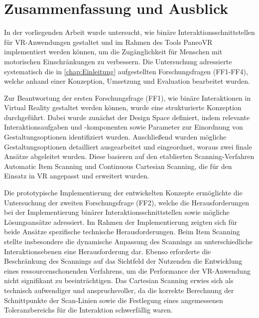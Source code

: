 \chapter{Zusammenfassung und Ausblick}
\label{chap:Fazit}

In der vorliegenden Arbeit wurde untersucht, wie binäre Interaktionsschnittstellen für VR-Anwendungen gestaltet und im Rahmen des Tools PaneoVR implementiert werden können, um die Zugänglichkeit für Menschen mit motorischen Einschränkungen zu verbessern. Die Untersuchung adressierte systematisch die in \autoref{chap:Einleitung} aufgestellten Forschungsfragen (FF1-FF4), welche anhand einer Konzeption, Umsetzung und Evaluation bearbeitet wurden.

Zur Beantwortung der ersten Forschungsfrage (FF1), wie binäre Interaktionen in Virtual Reality gestaltet werden können, wurde eine strukturierte Konzeption durchgeführt. Dabei wurde zunächst der Design Space definiert, indem relevante Interaktionsaufgaben und -komponenten sowie Parameter zur Einordnung von Gestaltungsoptionen identifiziert wurden. Anschließend wurden mögliche Gestaltungsoptionen detailliert ausgearbeitet und eingeordnet, woraus zwei finale Ansätze abgeleitet wurden. Diese basieren auf den etablierten Scanning-Verfahren Automatic Item Scanning und Continuous Cartesian Scanning, die für den Einsatz in VR angepasst und erweitert wurden.

Die prototypische Implementierung der entwickelten Konzepte ermöglichte die Untersuchung der zweiten Forschungsfrage (FF2), welche die Herausforderungen bei der Implementierung binärer Interaktionsschnittstellen sowie mögliche Lösungsansätze adressiert. Im Rahmen der Implementierung zeigten sich für beide Ansätze spezifische technische Herausforderungen. Beim Item Scanning stellte insbesondere die dynamische Anpassung des Scannings an unterschiedliche Interaktionsebenen eine Herausforderung dar. Ebenso erforderte die Beschränkung des Scannings auf das Sichtfeld der Nutzenden die Entwicklung eines ressourcenschonenden Verfahrens, um die Performance der VR-Anwendung nicht signifikant zu beeinträchtigen. Das Cartesian Scanning erwies sich als technisch aufwendiger und anspruchsvoller, da die korrekte Berechnung der Schnittpunkte der Scan-Linien sowie die Festlegung eines angemessenen Toleranzbereichs für die Interaktion schwerfällig waren.

